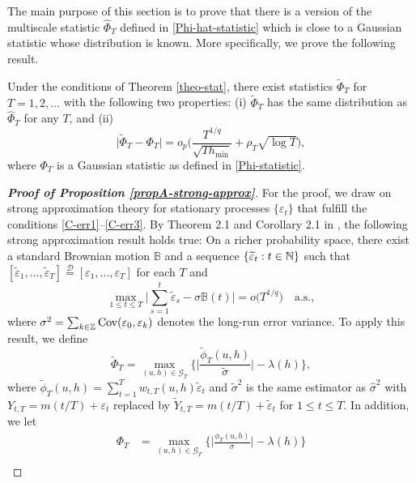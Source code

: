 The main purpose of this section is to prove that there is a version of the multiscale statistic $\widehat{\Phi}_T$ defined in \eqref{Phi-hat-statistic} which is close to a Gaussian statistic whose distribution is known. More specifically, we prove the following result. 
%
%
\begin{propA}\label{propA-strong-approx}
Under the conditions of Theorem \ref{theo-stat}, there exist statistics $\widetilde{\Phi}_T$ for $T = 1,2,\ldots$ with the following two properties: (i) $\widetilde{\Phi}_T$ has the same distribution as $\widehat{\Phi}_T$ for any $T$, and (ii)
\[ \big| \widetilde{\Phi}_T - \Phi_T \big| = o_p \Big( \frac{T^{1/q}}{\sqrt{T h_{\min}}} + \rho_T \sqrt{\log T} \Big), \]
where $\Phi_T$ is a Gaussian statistic as defined in \eqref{Phi-statistic}. 
\end{propA}
%
%
\begin{proof}[\textnormal{\textbf{Proof of Proposition \ref{propA-strong-approx}}}] 
For the proof, we draw on strong approximation theory for stationary processes $\{\varepsilon_t\}$ that fulfill the conditions \ref{C-err1}--\ref{C-err3}. By Theorem 2.1 and Corollary 2.1 in \cite{BerkesLiuWu2014}, the following strong approximation result holds true: On a richer probability space, there exist a standard Brownian motion $\mathbb{B}$ and a sequence $\{ \widetilde{\varepsilon}_t: t \in \mathbb{N} \}$ such that $[\widetilde{\varepsilon}_1,\ldots,\widetilde{\varepsilon}_T] \stackrel{\mathcal{D}}{=} [\varepsilon_1,\ldots,\varepsilon_T]$ for each $T$ and 
\begin{equation}\label{eq-strongapprox-dep}
\max_{1 \le t \le T} \Big| \sum\limits_{s=1}^t \widetilde{\varepsilon}_s - \sigma \mathbb{B}(t) \Big| = o\big( T^{1/q} \big) \quad \text{a.s.},  
\end{equation}
where $\sigma^2 = \sum_{k \in \mathbb{Z}} \textnormal{Cov}(\varepsilon_0, \varepsilon_k)$ denotes the long-run error variance. To apply this result, we define 
\[ \widetilde{\Phi}_T = \max_{(u,h) \in \mathcal{G}_T} \Big\{ \Big|\frac{\widetilde{\phi}_T(u,h)}{\widetilde{\sigma}}\Big| - \lambda(h) \Big\}, \]
where $\widetilde{\phi}_T(u,h) = \sum\nolimits_{t=1}^T w_{t,T}(u,h) \widetilde{\varepsilon}_t$ and $\widetilde{\sigma}^2$ is the same estimator as $\widehat{\sigma}^2$ with $Y_{t,T} = m(t/T) + \varepsilon_t$ replaced by $\widetilde{Y}_{t,T} = m(t/T) + \widetilde{\varepsilon}_t$ for $1 \le t \le T$. In addition, we let
\begin{align*}
\Phi_T & = \max_{(u,h) \in \mathcal{G}_T} \Big\{ \Big|\frac{\phi_T(u,h)}{\sigma}\Big| - \lambda(h) \Big\} \\

\end{align*}
\end{proof}
